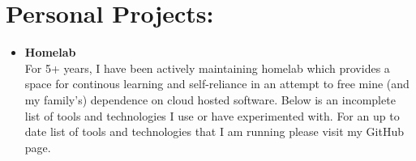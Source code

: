 \documentclass[a4paper,10pt]{article}
\begin{document}
\section*{Personal Projects:}
\begin{itemize}
\item\textbf{Homelab} \\
For 5+ years, I have been actively maintaining homelab which provides a space for continous learning and self-reliance in an attempt to free mine (and my family's) dependence on cloud hosted software. Below is an incomplete list of tools and technologies I use or have experimented with. For an up to date list of tools and technologies that I am running please visit my GitHub page.\\
    \begin{itemize}
        \small
    \end{itemize}
\end{itemize}
\end{document}
